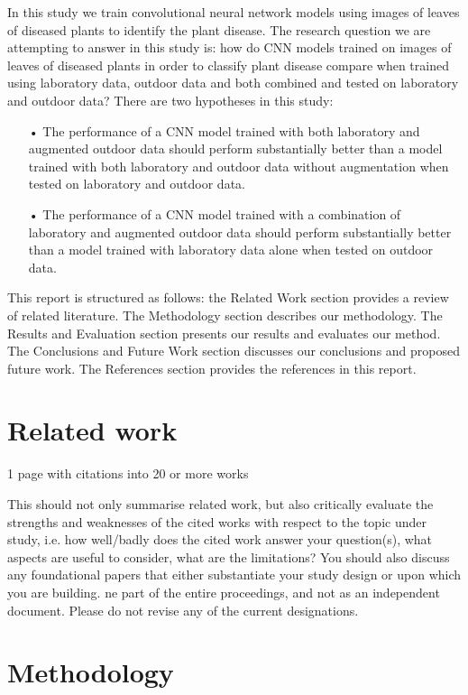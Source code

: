 \documentclass[conference]{IEEEtran}
\begin{document}
In this study we train convolutional neural network models using images of leaves of diseased plants to identify the plant disease. The research question we are attempting to answer in this study is: how do CNN models trained on images of leaves of diseased plants in order to classify plant disease compare when trained using laboratory data, outdoor data and both combined and tested on laboratory and outdoor data? There are two hypotheses in this study:
\begin{itemize}
\item[•]The performance of a CNN model trained with both laboratory and augmented outdoor data should perform substantially better than a model trained with both laboratory and outdoor data without augmentation when tested on laboratory and outdoor data. 
\item[•]The performance of a CNN model trained with a combination of laboratory and augmented outdoor data should perform substantially better than a model trained with laboratory data alone when tested on outdoor data.
\end{itemize}  

 

This report is structured as follows: the Related Work section provides a review of related literature. The Methodology section describes our methodology. The Results and Evaluation section presents our results and evaluates our method. The Conclusions and Future Work section discusses our conclusions and proposed future work. The References section provides the references in this report.

\section{Related work}
1 page with citations into 20 or more works  

This should not only summarise related work, but also critically evaluate the strengths and weaknesses of the cited works with respect to the topic under study, i.e. how well/badly does the cited work answer your question(s), what aspects are useful to consider, what are the limitations? You should also discuss any foundational papers that either substantiate your study design or upon which you are building. ne part of the entire proceedings, and not as an independent document. Please do not revise any of the current designations\cite{rezaei2021prediction}. 

\section{Methodology }
\end{document}
